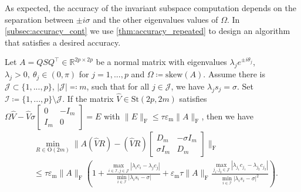 \documentclass[10pt,twoside,dvipsnames]{siamart1116}
\numberwithin{algorithm}{section}
\numberwithin{equation}{section}
\begin{document}
	As expected, the accuracy of the invariant subspace computation depends on the separation between $\pm i\sigma$ and the other eigenvalues values of $\Omega$. In \cref{subsec:accuracy_cont} we use \cref{thm:accuracy_repeated} to design an algorithm that satisfies a desired accuracy.
\begin{theorem}\label{thm:accuracy_repeated}
Let $A=QSQ^\top \in\mathbb{R}^{2p\times 2p}$ be a normal matrix with eigenvalues $\lambda_j e^{\pm i\theta_j}$, $\lambda_j>0,\ \theta_j\in(0,\pi)$ for $j=1,...,p$ and $\Omega \coloneq \mathrm{skew}(A)$. Assume there is $\mathcal{J}\subset\{1,...,p\}$, $|\mathcal{J}|\eqcolon m$, such that for all $j\in\mathcal{J}$, we have $ \lambda_{j} s_{j}=\sigma$. Set $\mathcal{I}\coloneq\{1,...,p\}\setminus \mathcal{J}$. If the matrix $\widehat{V}\in\mathrm{St}(2p,2m)$ satisfies $\Omega\widehat{V}-\widehat{V}\sigma\left[\begin{smallmatrix}0&-I_m\\
	I_m&0\end{smallmatrix}\right]=E$ with $\|E\|_\mathrm{F}\leq \tau \varepsilon_\mathrm{m} \|A\|_\mathrm{F}$, then we have
\begin{align*}
	&\min_{R\in\mathrm{O}(2m)}\|A(\widehat{V}R)-(\widehat{V}R)\left[\begin{smallmatrix}
		D_m&-\sigma I_m\\
		\sigma I_m&D_m
		\end{smallmatrix}\right]\|_\mathrm{F} \\&\leq\tau \varepsilon_\mathrm{m} \|A\|_\mathrm{F} \left(1 + \frac{\max\limits_{i\in\mathcal{I},j\in\mathcal{J}}|\lambda_i c_i-\lambda_j c_j|}{\min\limits_{i\in\mathcal{I}}|\lambda_i s_i-\sigma|}+ \varepsilon_\mathrm{m} \tau\|A\|_\mathrm{F}\frac{ \max\limits_{j_1,j_2\in\mathcal{J}}|\lambda_{j_1} c_{j_1}-\lambda_{j_2} c_{j_2}|}{\min\limits_{i\in\mathcal{I}}|\lambda_i s_i-\sigma|^2}\right).
\end{align*}
\end{theorem}
\end{document}
